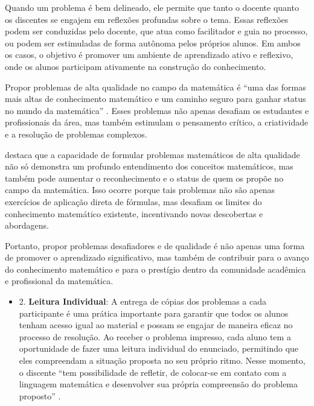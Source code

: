 Quando um problema é bem delineado, ele permite que tanto o docente quanto os discentes se engajem em reflexões profundas sobre o tema. Essas reflexões podem ser conduzidas pelo docente, que atua como facilitador e guia no processo, ou podem ser estimuladas de forma autônoma pelos próprios alunos. Em ambos os casos, o objetivo é promover um ambiente de aprendizado ativo e reflexivo, onde os alunos participam ativamente na construção do conhecimento.

Propor problemas de alta qualidade no campo da matemática é ``uma das formas mais altas de conhecimento matemático e um caminho seguro para ganhar
status no mundo da matemática'' \cite[p. 494]{CRESPO2015}. Esses problemas não apenas desafiam os estudantes e profissionais da área, mas também estimulam o pensamento crítico, a criatividade e a resolução de problemas complexos.

 destaca que a capacidade de formular problemas matemáticos de alta qualidade não só demonstra um profundo entendimento dos conceitos matemáticos, mas também pode aumentar o reconhecimento e o status de quem os propõe no campo da matemática. Isso ocorre porque tais problemas não são apenas exercícios de aplicação direta de fórmulas, mas desafiam os limites do conhecimento matemático existente, incentivando novas descobertas e abordagens.

Portanto, propor problemas desafiadores e de qualidade é não apenas uma forma de promover o aprendizado significativo, mas também de contribuir para o avanço do conhecimento matemático e para o prestígio dentro da comunidade acadêmica e profissional da matemática.


\begin{itemize}
    \item 2. \textbf{Leitura Individual}: A entrega de cópias dos problemas a cada participante é uma prática importante para garantir que todos os alunos tenham acesso igual ao material e possam se engajar de maneira eficaz no processo de resolução. Ao receber o problema impresso, cada aluno tem a oportunidade de fazer uma leitura individual do enunciado, permitindo que eles compreendam a situação proposta no seu próprio ritmo. Nesse momento, o discente ``tem possibilidade de refletir, de colocar-se em contato com a linguagem matemática e desenvolver sua própria compreensão do problema proposto'' \cite[p. 45]{OSHIMA2011}.
\end{itemize}

